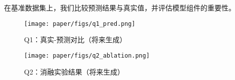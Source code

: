 在基准数据集上，我们比较预测结果与真实值，并评估模型组件的重要性。
\begin{figure}[htbp]\centering
  \texttt{[image: paper/figs/q1\_pred.png]}
  \caption{Q1：真实-预测对比（将来生成）}
\end{figure}
\begin{figure}[htbp]\centering
  \texttt{[image: paper/figs/q2\_ablation.png]}
  \caption{Q2：消融实验结果（将来生成）}
\end{figure}
